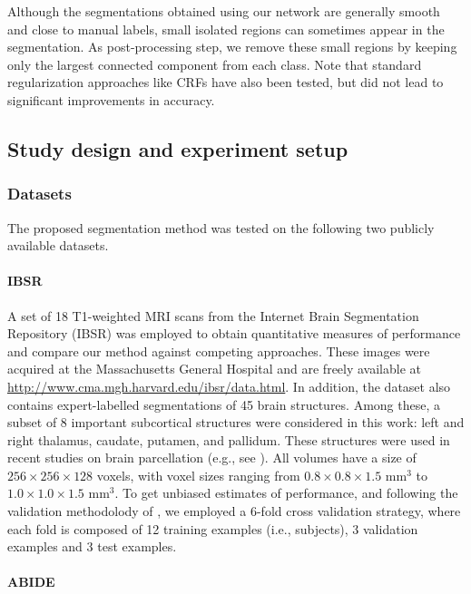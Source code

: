 \documentclass[twoside,fleqn,espcrc2]{elsarticle}
\begin{document}
Although the segmentations obtained using our network are generally smooth and close to manual labels, small isolated regions can sometimes appear in the segmentation. As post-processing step, we remove these small regions by keeping only the largest connected component from each class. Note that standard regularization approaches like CRFs \cite{lafferty2001conditional} have also been tested, but did not lead to significant improvements in accuracy. 

\subsection{Study design and experiment setup}
\label{ssec:experiments}


\subsubsection{Datasets}
\label{sssec:dataset}

The proposed segmentation method was tested on the following two publicly available datasets.

\paragraph{\textbf{IBSR}}

A set of 18 T1-weighted MRI scans from the Internet Brain Segmentation Repository (IBSR) was employed to obtain quantitative measures of performance and compare our method against competing approaches. These images were acquired at the Massachusetts General Hospital and are freely available at \url{http://www.cma.mgh.harvard.edu/ibsr/data.html}. In addition, the dataset also contains expert-labelled segmentations of 45 brain structures. Among these, a subset of 8 important subcortical structures were considered in this work: left and right thalamus, caudate, putamen, and pallidum. These structures were used in recent studies on brain parcellation (e.g., see \cite{shakeri2016sub}). All volumes have a size of $256\!\times\!256\!\times\!128$ voxels, with voxel sizes ranging from $0.8\!\times\!0.8\!\times\!1.5 \textrm{ mm}^3$ to $1.0 \!\times\!1.0\!\times\!1.5 \textrm{ mm}^3$.  To get unbiased estimates of performance, and following the validation methodolody of \cite{shakeri2016sub}, we employed a 6-fold cross validation strategy, where each fold is composed of 12 training examples (i.e., subjects), 3 validation examples and 3 test examples.

\paragraph{\textbf{ABIDE}}
\end{document}
